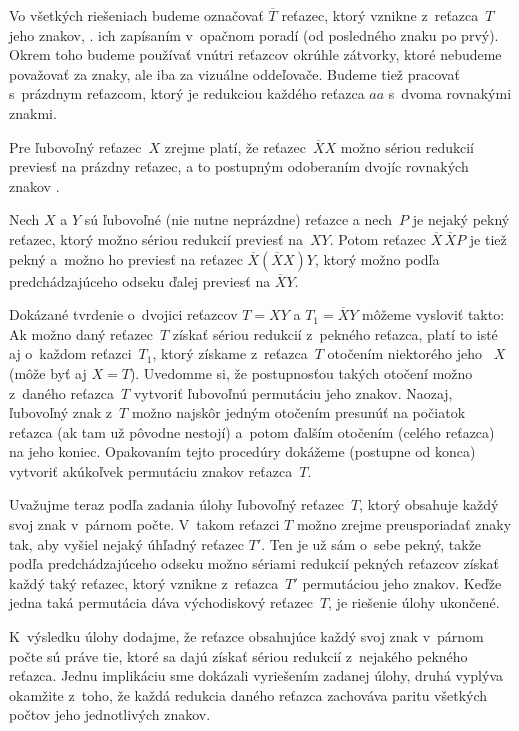 {%
Vo všetkých riešeniach budeme označovať $\overline{T}$ reťazec, ktorý
vznikne z~reťazca~$T$  jeho znakov, \tj. ich zapísaním
v~opačnom poradí (od posledného znaku po prvý).
Okrem toho budeme používať vnútri
reťazcov okrúhle zátvorky, ktoré nebudeme považovať za znaky, ale iba
za vizuálne oddeľovače. Budeme tiež pracovať s~prázdnym
reťazcom, ktorý je redukciou každého reťazca $aa$ s~dvoma rovnakými
znakmi.

Pre ľubovoľný reťazec~$X$ zrejme platí, že reťazec~$\overline{X}X$
možno sériou redukcií previesť na prázdny reťazec, a to postupným
odoberaním dvojíc rovnakých znakov .

Nech $X$ a $Y$ sú ľubovoľné (nie nutne neprázdne) reťazce
a nech~$P$ je nejaký pekný reťazec, ktorý možno sériou redukcií
previesť na~$XY$. Potom reťazec $\overline{X}\,\overline{X}P$ je tiež
pekný a~možno ho previesť na reťazec $\overline{X}(\overline{X}X)Y$,
ktorý možno podľa predchádzajúceho odseku ďalej previesť na $\overline{X}Y$.

Dokázané tvrdenie o~dvojici reťazcov $T=XY$ a $T_1=\overline{X}Y$
môžeme vysloviť takto: Ak možno daný reťazec~$T$ získať sériou
redukcií z~pekného reťazca, platí to isté aj o~každom reťazci~$T_1$,
ktorý získame z~reťazca~$T$ otočením niektorého jeho ~$X$
(môže byť aj $X=T$). Uvedomme si,
že postupnosťou takých otočení možno z~daného
reťazca~$T$ vytvoriť ľubovoľnú permutáciu jeho znakov. Naozaj,
ľubovoľný znak z~$T$ možno najskôr jedným otočením presunúť na
počiatok reťazca (ak tam už pôvodne nestojí) a~potom ďalším
otočením (celého reťazca) na jeho koniec. Opakovaním tejto procedúry
dokážeme (postupne od konca) vytvoriť akúkoľvek permutáciu znakov
reťazca~$T$.

Uvažujme teraz podľa zadania úlohy ľubovoľný reťazec~$T$,
ktorý obsahuje každý svoj znak v~párnom počte.
V~takom reťazci $T$ možno zrejme preusporiadať
znaky tak, aby vyšiel nejaký úhľadný reťazec $T'$.
Ten je už sám o~sebe pekný, takže podľa predchádzajúceho odseku
možno sériami redukcií pekných reťazcov získať každý taký reťazec,
ktorý vznikne z~reťazca~$T'$ permutáciou jeho znakov.
Keďže jedna taká permutácia dáva východiskový reťazec~$T$,
je riešenie úlohy ukončené.

\Pozn
K~výsledku úlohy dodajme, že reťazce obsahujúce každý svoj znak v~párnom
počte sú práve tie, ktoré sa dajú získať sériou redukcií
z~nejakého pekného reťazca. Jednu implikáciu sme dokázali
vyriešením zadanej úlohy, druhá vyplýva okamžite z~toho, že každá redukcia
daného reťazca zachováva paritu všetkých počtov jeho jednotlivých znakov.

}
